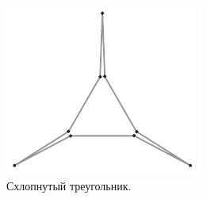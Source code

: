 \begin{figure}[htb!]
\centering
\includegraphics[scale=1]{pics/treug}
\caption{Схлопнутый треугольник.}
\label{pic:treug}
\end{figure}
